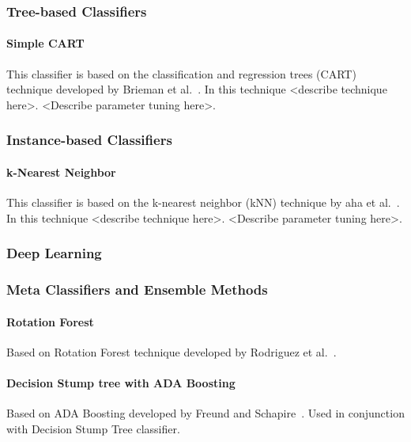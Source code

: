 \subsubsection{Tree-based Classifiers}

\paragraph{Simple CART}

This classifier is based on the classification and regression trees (CART) technique developed by Brieman et al.~\cite{CART}. In this technique <describe technique here>. <Describe parameter tuning here>.

\subsubsection{Instance-based Classifiers}

\paragraph{k-Nearest Neighbor}

This classifier is based on the k-nearest neighbor (kNN) technique by aha et al.~\cite{kNN}. In this technique <describe technique here>. <Describe parameter tuning here>.


\subsubsection{Deep Learning}


\subsubsection{Meta Classifiers and Ensemble Methods}

\paragraph{Rotation Forest}

Based on Rotation Forest technique developed by Rodriguez et al.~\cite{RotationForest}.

\paragraph{Decision Stump tree with ADA Boosting}

Based on ADA Boosting developed by Freund and Schapire~\cite{ADABoosting}. Used in conjunction with Decision Stump Tree classifier.

